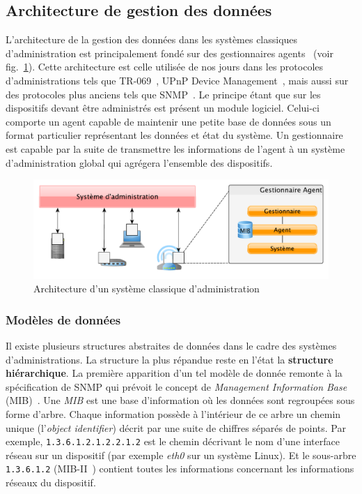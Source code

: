 \subsection{Architecture de gestion des données}
L'architecture de la gestion des données dans les systèmes classiques d'administration est principalement fondé sur des gestionnaires agents~\cite{CCITT:X700} (voir fig.~\ref{fig:rw:supervision:administration}). Cette architecture est celle utilisée de nos jours dans les protocoles d'administrations tels que TR-069~\cite{BBF:tr069}, UPnP Device Management~\cite{UPnP:MD}, mais aussi sur des protocoles plus anciens tels que SNMP~\cite{IETF:SNMP}. Le principe étant que sur les dispositifs devant être administrés est présent un module logiciel. Celui-ci comporte un agent capable de maintenir une petite base de données sous un format particulier représentant les données et état du système. Un gestionnaire est capable par la suite de transmettre les informations de l'agent à un système d'administration global qui agrégera l'ensemble des dispositifs.
\begin{figure}[ht]
    \centering
    \includegraphics[width=.75\textwidth]{fig/rw-supervision-administration}
    \caption{Architecture d'un système classique d'administration}\label{fig:rw:supervision:administration}
\end{figure}

\subsubsection{Modèles de données}
Il existe plusieurs structures abstraites de données dans le cadre des systèmes d'administrations. La structure la plus répandue reste en l'état la \textbf{structure hiérarchique}. La première apparition d'un tel modèle de donnée remonte à la spécification de SNMP qui prévoit le concept de \textit{Management Information Base} (MIB)~\cite{IETF:MIB}. Une \textit{MIB} est une base d'information où les données sont regroupées sous forme d'arbre. Chaque information possède à l'intérieur de ce arbre un chemin unique (l'\textit{object identifier}) décrit par une suite de chiffres séparés de points. Par exemple, \verb|1.3.6.1.2.1.2.2.1.2| est le chemin décrivant le nom d'une interface réseau sur un dispositif (par exemple \textit{eth0} sur un système Linux). Et le sous-arbre \verb|1.3.6.1.2| (MIB-II~\cite{IETF:MIB-II}) contient toutes les informations concernant les informations réseaux du dispositif.

